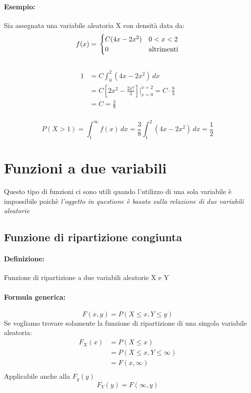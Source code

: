 \documentclass[]{article}
\newcommand{\definizione}{\paragraph{Definizione:}}
\newcommand{\formula}{\paragraph{Formula generica:}}
\begin{document}
    \paragraph{Esempio:} Sia assegnata una variabile aleatoria X con densità data da:
    \begin{equation*}
        f(x) = \\
        \begin{cases}
            C(4x - 2x^2) & 0 < x < 2 \\
            0 & \text{altrimenti}
        \end{cases}
    \end{equation*}
     \\
    \linebreak[4]
    \begin{equation*}
        \begin{split}
            1 & = C \int_{0}^{2} (4x - 2x^2) \, dx\\
            & = C[2x^2 - \frac{2x^3}{3}] \bigg\rvert_{x=0}^{x=2} = C \cdot \frac{8}{3} \\
            & = C = \frac{3}{8}
        \end{split}
    \end{equation*} \\
    \linebreak[4]
    \[ P(X > 1) = \int_{1}^{\infty} f(x) \, dx = \frac{3}{8} \int_{1}^{2}(4x - 2x^2) \, dx = \frac{1}{2} \]
    \newpage

    \section{Funzioni a due variabili}
    Questo tipo di funzioni ci sono utili quando l'utilizzo di una sola variabile è impossibile poichè 
    \textit{l'oggetto in questione è basato sulla relazione di due variabili aleatorie}
    \subsection{Funzione di ripartizione congiunta}
    \definizione Funzione di ripartizione a due variabili aleatorie X e Y
    \formula \[ F(x, y) = P(X \leq x, Y \leq y) \]
    Se vogliamo trovare solamente la funzione di ripartizione di una singola variabile aleatoria:
    \begin{equation*}
    \begin{split}
        F_X(x) & = P(X \leq x) \\
        & = P(X \leq x, Y \leq \infty) \\
        & = F(x, \infty) \\
    \end{split}
    \end{equation*}
    Applicabile anche alla $F_y(y)$
    \[ F_Y(y) = F(\infty, y) \]
\end{document}
